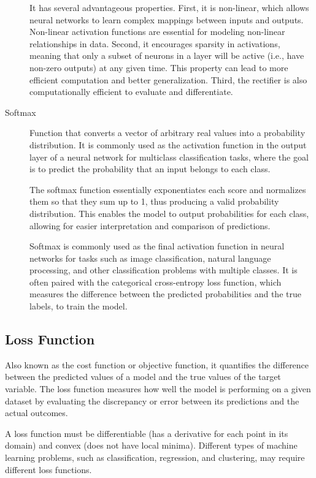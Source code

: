 \documentclass[a4paper]{report}
\begin{document}
\begin{description}
It has several advantageous properties. First, it is non-linear, which allows neural networks to learn complex mappings between inputs and outputs. Non-linear activation functions are essential for modeling non-linear relationships in data. Second, it encourages sparsity in activations, meaning that only a subset of neurons in a layer will be active (i.e., have non-zero outputs) at any given time. This property can lead to more efficient computation and better generalization. Third, the rectifier is also computationally efficient to evaluate and differentiate.

\item[Softmax]
Function that converts a vector of arbitrary real values into a probability distribution. It is commonly used as the activation function in the output layer of a neural network for multiclass classification tasks, where the goal is to predict the probability that an input belongs to each class.

The softmax function essentially exponentiates each score and normalizes them so that they sum up to 1, thus producing a valid probability distribution. This enables the model to output probabilities for each class, allowing for easier interpretation and comparison of predictions.

Softmax is commonly used as the final activation function in neural networks for tasks such as image classification, natural language processing, and other classification problems with multiple classes. It is often paired with the categorical cross-entropy loss function, which measures the difference between the predicted probabilities and the true labels, to train the model.

\end{description}


\subsection*{Loss Function}
Also known as the cost function or objective function, it quantifies the difference between the predicted values of a model and the true values of the target variable. The loss function measures how well the model is performing on a given dataset by evaluating the discrepancy or error between its predictions and the actual outcomes.

A loss function must be differentiable (has a derivative for each point in its domain) and convex (does not have local minima). Different types of machine learning problems, such as classification, regression, and clustering, may require different loss functions.
\end{document}
